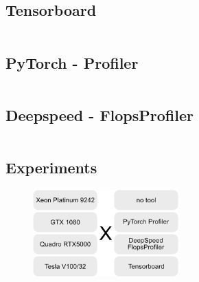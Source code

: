 \documentclass[12pt, a4paper, hidelinks]{article}
\begin{document}
\subsection{Tensorboard}
\label{sec:Tensorboard}

\begin{listing}[H]
\inputminted[xleftmargin=1em,linenos,fontsize=\scriptsize, highlightlines={1,3,9-12,14-16}]{python}{./assets/tensorboard.py}
\caption{}
\label{lst:tensorboard}
\end{listing}

\subsection{PyTorch - Profiler}
\label{sec:m-pytorch-profiler}

\begin{listing}[H]
\inputminted[xleftmargin=1em,linenos,fontsize=\scriptsize, highlightlines={4-10,14,15}]{python}{./assets/profiler-torch.py}
\caption{}
\label{lst:profiler-torch}
\end{listing}

\subsection{Deepspeed - FlopsProfiler}
\label{sec:m-flopsprofiler}


\begin{listing}[H]
\inputminted[xleftmargin=1em,linenos,fontsize=\scriptsize, highlightlines={1,3,4,8,9,11-18}]{python}{./assets/deepspeed.py}
\caption{}
\label{lst:deepspeed}
\end{listing}

\subsection{Experiments}
\label{sec:m-experiments}

\begin{figure}[H]
\centering
\includegraphics[width=0.5\textwidth]{./assets/experiments.png}
\caption*{}
\label{fig:experiments}
\end{figure}
\end{document}
